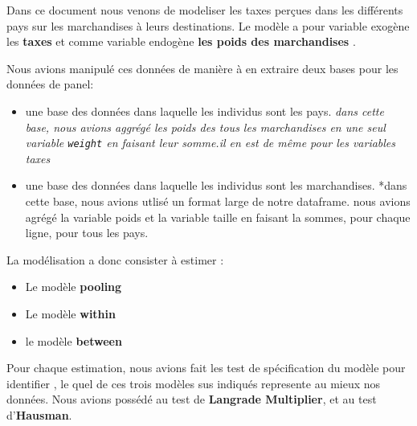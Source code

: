 \documentclass[
]{book}
\providecommand{\tightlist}{%
  \setlength{\itemsep}{0pt}\setlength{\parskip}{0pt}}
\begin{document}
Dans ce document nous venons de modeliser les taxes perçues dans les différents pays sur les marchandises à leurs destinations. Le modèle a pour variable exogène les \textbf{taxes} et comme variable endogène \textbf{les poids des marchandises} .

Nous avions manipulé ces données de manière à en extraire deux bases pour les données de panel:

\begin{itemize}
\tightlist
\item
  une base des données dans laquelle les individus sont les pays.
  \emph{dans cette base, nous avions aggrégé les poids des tous les marchandises en une seul variable \texttt{weight} en faisant leur somme.il en est de même pour les variables taxes}
\item
  une base des données dans laquelle les individus sont les marchandises.
  *dans cette base, nous avions utlisé un format large de notre dataframe. nous avions agrégé la variable poids et la variable taille en faisant la sommes, pour chaque ligne, pour tous les pays.
\end{itemize}

La modélisation a donc consister à estimer :

\begin{itemize}
\tightlist
\item
  Le modèle \textbf{pooling}
\item
  Le modèle \textbf{within}
\item
  le modèle \textbf{between}
\end{itemize}

Pour chaque estimation, nous avions fait les test de spécification du modèle pour identifier , le quel de ces trois modèles sus indiqués represente au mieux nos données. Nous avions possédé au test de \textbf{Langrade Multiplier}, et au test d'\textbf{Hausman}.

  
\end{document}
